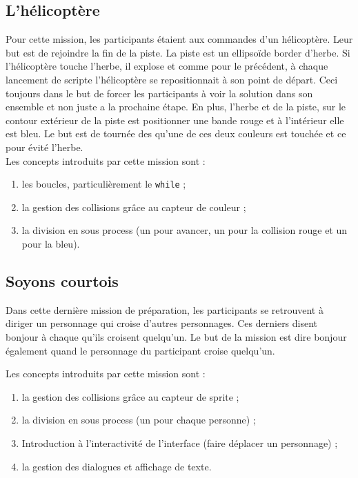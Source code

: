 \subsection{L'hélicoptère}
Pour cette mission, les participants étaient aux commandes d'un hélicoptère. Leur but est de rejoindre la fin de la piste. La piste est un ellipsoïde border d'herbe. Si l'hélicoptère touche l'herbe, il explose et comme pour le précédent, à chaque lancement de scripte l'hélicoptère se repositionnait à son point de départ. Ceci toujours dans le but de forcer les participants à voir la solution dans son ensemble et non juste a la prochaine étape. En plus, l'herbe et de la piste, sur le contour extérieur de la piste est positionner une bande rouge et à l'intérieur elle est bleu. Le but est de tournée des qu'une de ces deux couleurs est touchée et ce pour évité l'herbe.\\

Les concepts introduits par cette mission sont :
\begin{enumerate}
\item les boucles, particulièrement le \texttt{while} ;
\item la gestion des collisions grâce au capteur de couleur ;
\item la division en sous process (un pour avancer, un pour la collision rouge et un pour la bleu).
\end{enumerate}

\subsection{Soyons courtois}
Dans cette dernière mission de préparation, les participants se retrouvent à diriger un personnage qui croise d'autres personnages. Ces derniers disent bonjour à chaque qu'ils croisent quelqu'un. Le but de la mission est dire bonjour également quand le personnage du participant croise quelqu'un.

Les concepts introduits par cette mission sont :
\begin{enumerate}
\item la gestion des collisions grâce au capteur de sprite ;
\item la division en sous process (un pour chaque personne) ;
\item Introduction à l'interactivité de l'interface (faire déplacer un personnage) ;
\item la gestion des dialogues et affichage de texte.
\end{enumerate}

